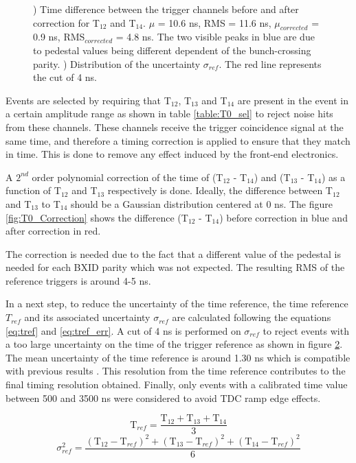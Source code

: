 \begin{figure}[htbp!]
\begin{subfigure}[t]{0.49\textwidth}
		\caption{} \label{fig:T0ReferenceError}
	\end{subfigure}
	\caption{) Time difference between the trigger channels before and after correction for T$_{12}$ and T$_{14}$. $\mu$ = 10.6 ns, RMS = 11.6 ns, $\mu_{corrected}$ = 0.9 ns, RMS$_{corrected}$ = 4.8 ns. The two visible peaks in blue are due to pedestal values being different dependent of the bunch-crossing parity. ) Distribution of the uncertainty $\sigma_{ref}$. The red line represents the cut of 4 ns.}
\end{figure}

Events are selected by requiring that T$_{12}$, T$_{13}$ and T$_{14}$ are present in the event in a certain amplitude range as shown in table \ref{table:T0_sel} to reject noise hits from these channels. These channels receive the trigger coincidence signal at the same time, and therefore a timing correction is applied to ensure that they match in time. This is done to remove any effect induced by the front-end electronics.

A $2^{nd}$ order polynomial correction of the time of (T$_{12}$ - T$_{14}$) and (T$_{13}$ - T$_{14}$) as a function of T$_{12}$ and T$_{13}$ respectively is done. Ideally, the difference between T$_{12}$ and T$_{13}$ to T$_{14}$ should be a Gaussian distribution centered at 0 ns. The figure \ref{fig:T0_Correction} shows the difference (T$_{12}$ - T$_{14}$) before correction in blue and after correction in red.

The correction is needed due to the fact that a different value of the pedestal is needed for each BXID parity which was not expected. The resulting RMS of the reference triggers is around 4-5 ns.

In a next step, to reduce the uncertainty of the time reference, the time reference $T_{ref}$ and its associated uncertainty $\sigma_{ref}$ are calculated following the equations \ref{eq:tref} and \ref{eq:tref_err}. A cut of 4 ns is performed on $\sigma_{ref}$ to reject events with a too large uncertainty on the time of the trigger reference as shown in figure \ref{fig:T0ReferenceError}. The mean uncertainty of the time reference is around 1.30 ns which is compatible with previous results \cite{Laurien2016}. This resolution from the time reference contributes to the final timing resolution obtained. Finally, only events with a calibrated time value between 500 and 3500 ns were considered to avoid TDC ramp edge effects.

\begin{equation} \label{eq:tref}
	\text{T}_{ref} = \frac{\text{T}_{12} + \text{T}_{13} + \text{T}_{14}}{3}
\end{equation}
\begin{equation} \label{eq:tref_err}
	\sigma_{ref}^2 = \frac{ (\text{T}_{12} - \text{T}_{ref})^2 + (\text{T}_{13} - \text{T}_{ref})^2  + (\text{T}_{14} - \text{T}_{ref})^2 }{6}
\end{equation}

